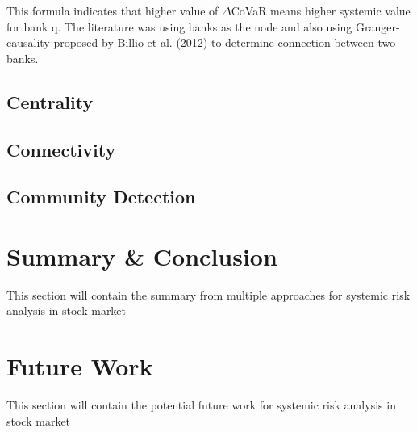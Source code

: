 \documentclass[a4paper,11pt]{article}
\begin{document}
This formula indicates that higher value of $\Delta$CoVaR means higher systemic value for bank q. The literature was using banks as the node and also using Granger-causality proposed by Billio et al. (2012) to determine connection between two banks.

\subsection{Centrality}
\subsection{Connectivity}
\subsection{Community Detection}

\section{Summary \& Conclusion}
This section will contain the summary from multiple approaches for systemic risk analysis in stock market

\section{Future Work}
This section will contain the potential future work for systemic risk analysis in stock market



\small
\end{document}
